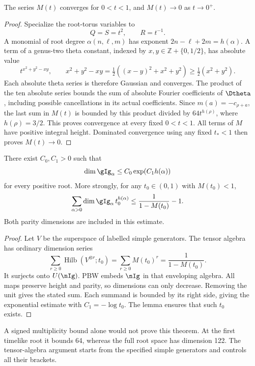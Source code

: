 \begin{lemma}
The series \(M(t)\) converges for \(0<t<1\), and
\(M(t)\to0\) as \(t\to0^+\).
\end{lemma}
\begin{proof}
Specialize the root-torus variables to
\[
 Q=S=t^2,\qquad R=t^{-1}.
\]
A monomial of root degree \(\alpha(n,\ell,m)\) has exponent
\(2n-\ell+2m=h(\alpha)\). A term of a genus-two theta
constant, indexed by \(x,y\in\mathbb Z+\{0,1/2\}\), has
absolute value
\[
 t^{x^2+y^2-xy},\qquad
 x^2+y^2-xy=\tfrac12((x-y)^2+x^2+y^2)
             \geq\tfrac12(x^2+y^2).
\]
Each absolute theta series is therefore Gaussian and converges.
The product of the ten absolute series bounds the sum of absolute
Fourier coefficients of \(\Dtheta\), including possible
cancellations in its actual coefficients. Since
\(m(a)=-c_{\rho+a}\), the last sum in \(M(t)\) is bounded
by this product divided by \(64t^{h(\rho)}\), where
\(h(\rho)=3/2\). This proves convergence at every fixed
\(0<t<1\). All terms of \(M\) have positive integral height.
Dominated convergence using any fixed \(t_*<1\) then proves
\(M(t)\to0\).
\end{proof}

\begin{theorem}
There exist \(C_0,C_1>0\) such that
\begin{equation}\label{eq:vol3-root-growth}
 \dim\gIg_\alpha\leq C_0\exp(C_1h(\alpha))
\end{equation}
for every positive root. More strongly, for any \(t_0\in(0,1)\)
with \(M(t_0)<1\),
\[
 \sum_{\alpha>0}\dim\gIg_\alpha\,t_0^{h(\alpha)}
 \leq\frac{1}{1-M(t_0)}-1.
\]
Both parity dimensions are included in this estimate.
\end{theorem}
\begin{proof}
Let \(V\) be the superspace of labelled simple generators. The
tensor algebra has ordinary dimension series
\[
 \sum_{r\geq0}\operatorname{Hilb}(V^{\otimes r};t_0)
       =\sum_{r\geq0}M(t_0)^r=\frac1{1-M(t_0)}.
\]
It surjects onto \(U(\nIg)\). PBW embeds \(\nIg\) in that
enveloping algebra. All maps preserve height and parity, so dimensions
can only decrease. Removing the unit gives the stated sum. Each
summand is bounded by its right side, giving the exponential estimate
with \(C_1=-\log t_0\). The lemma ensures that such \(t_0\)
exists.
\end{proof}

A signed multiplicity bound alone would not prove this theorem.
At the first timelike root it bounds 64, whereas the full root
space has dimension 122. The tensor-algebra argument starts from
the specified simple generators and controls all their brackets.

